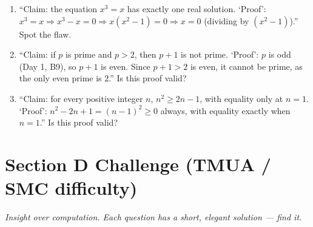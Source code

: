 \documentclass[11pt,a4paper]{article}
\begin{document}
\begin{enumerate}
\item ``Claim: the equation $x^3=x$ has exactly one real solution. `Proof': $x^3=x \Rightarrow x^3-x=0 \Rightarrow x(x^2-1)=0 \Rightarrow x=0$ (dividing by $(x^2-1)$).'' Spot the flaw.

\item ``Claim: if $p$ is prime and $p>2$, then $p+1$ is not prime. `Proof': $p$ is odd (Day 1, B9), so $p+1$ is even. Since $p+1>2$ is even, it cannot be prime, as the only even prime is $2$.'' Is this proof valid?

\item ``Claim: for every positive integer $n$, $n^2 \geq 2n-1$, with equality only at $n=1$. `Proof': $n^2-2n+1=(n-1)^2\geq0$ always, with equality exactly when $n=1$.'' Is this proof valid?

\end{enumerate}

\section*{Section D \quad Challenge \hfill{\normalfont\small(TMUA / SMC difficulty)}}

\noindent\textit{Insight over computation. Each question has a short, elegant solution --- find it.}
\end{document}
